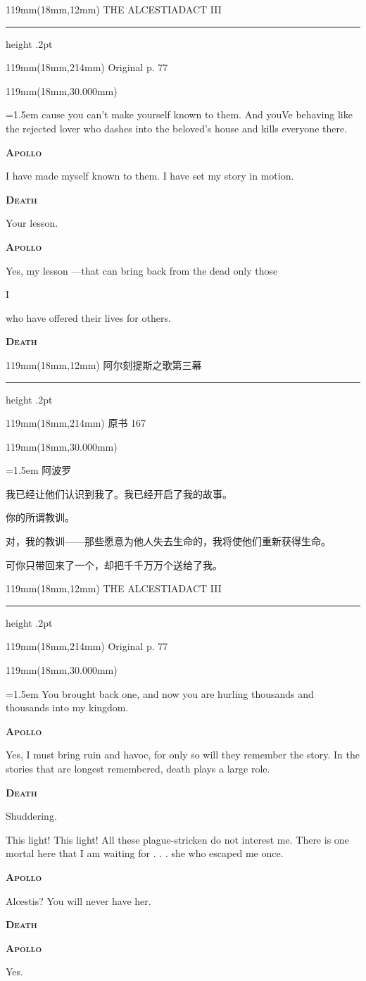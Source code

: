 \documentclass{article}
\newcommand{\ENsetup}{\normalfont\color{ink}\fontsize{11}{16.5}\selectfont\emergencystretch=1.5em}
\newcommand{\ZHsetup}{\normalfont\color{ink}\fontsize{10.5}{17}\selectfont\emergencystretch=1.5em}
\newcommand{\ENspeaker}[1]{{\fontsize{9.8}{13}\selectfont\scshape\bfseries #1}\par\vspace{3pt}}
\newcommand{\ZHspeaker}[1]{{\hei\fontsize{10.3}{13}\selectfont #1}\par\vspace{3pt}}
\newcommand{\ENstage}[1]{\par\noindent{\itshape #1}\par}
\newcommand{\Block}[3]{\begin{textblock*}{119mm}(18mm,#1mm){#2 #3\par}\end{textblock*}}
\newcommand{\Heading}[3]{%
  \begin{textblock*}{119mm}(18mm,12mm)
    \color{quiet}\fontsize{7.5}{10}\selectfont
    #1\hfill #2\par\vspace{3mm}\hrule height .2pt
  \end{textblock*}
  \begin{textblock*}{119mm}(18mm,214mm)
    \color{quiet}\fontsize{7}{10}\selectfont #3\hfill\thepage
  \end{textblock*}
}
\begin{document}
\newpage
\null
\Heading{THE ALCESTIAD}{ACT III}{Original p. 77}
\Block{30.000}{\ENsetup}{\sloppy
cause you can't make yourself known to them. And youVe behaving like the rejected lover who dashes into the beloved's house and kills everyone there.\par\vspace{2pt}
\ENspeaker{Apollo}
I have made myself known to them. I have set my story in motion.\par\vspace{2pt}
\ENspeaker{Death}
Your lesson.\par\vspace{2pt}
\ENspeaker{Apollo}
Yes, my lesson —that can bring back from the dead only those\par\vspace{2pt}
I\par\vspace{2pt}
who have offered their lives for others.\par\vspace{2pt}
\ENspeaker{Death}}
\newpage
\null
\Heading{阿尔刻提斯之歌}{第三幕}{原书 167}
\Block{30.000}{\ZHsetup}{\ZHspeaker{阿波罗}我已经让他们认识到我了。我已经开启了我的故事。\par \vspace{2.2mm}\ZHspeaker{死神}你的所谓教训。\par \vspace{2.2mm}\ZHspeaker{阿波罗}对，我的教训——那些愿意为他人失去生命的，我将使他们重新获得生命。\par \vspace{2.2mm}\ZHspeaker{死神}可你只带回来了一个，却把千千万万个送给了我。\par }
\newpage
\null
\Heading{THE ALCESTIAD}{ACT III}{Original p. 77}
\Block{30.000}{\ENsetup}{\sloppy
You brought back one, and now you are hurling thousands and thousands into my kingdom.\par\vspace{2pt}
\ENspeaker{Apollo}
Yes, I must bring ruin and havoc, for only so will they remember the story. In the stories that are longest remembered, death plays a large role.\par\vspace{2pt}
\ENspeaker{Death}
Shuddering.\par\vspace{2pt}
This light! This light! All these plague-stricken do not interest me. There is one mortal here that I am waiting for . . . she who escaped me once.\par\vspace{2pt}
\ENspeaker{Apollo}
Alcestis? You will never have her.\par\vspace{2pt}
\ENspeaker{Death}
\ENstage{She is mortal!}
\ENspeaker{Apollo}
Yes.\par\vspace{2pt}}
\end{document}
